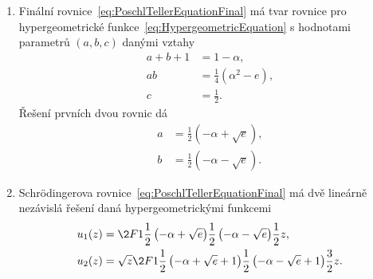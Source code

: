\begin{solution}
\begin{enumerate}
    \item 
        Finální rovnice~\eqref{eq:PoschlTellerEquationFinal} má tvar rovnice pro hypergeometrické funkce~\eqref{eq:HypergeometricEquation} s hodnotami parametrů $(a,b,c)$ danými vztahy
        \begin{subequations}
            \begin{align}
                a+b+1&=1-\alpha,\\
                ab&=\frac{1}{4}\left(\alpha^{2}-e\right),\\
                c&=\frac{1}{2}.
            \end{align}                
        \end{subequations}
        Řešení prvních dvou rovnic dá
        \begin{subequations}
            \begin{align}
                a&=\frac{1}{2}\left(-\alpha+\sqrt{e}\right),\\
                b&=\frac{1}{2}\left(-\alpha-\sqrt{e}\right).
            \end{align}                
        \end{subequations}

    \item
        Schrödingerova rovnice~\eqref{eq:PoschlTellerEquationFinal} má dvě lineárně nezávislá řešení daná hypergeometrickými funkcemi
        \begin{align}
            u_{1}(z)&=\2F1{\frac{1}{2}\left(-\alpha+\sqrt{e}\right)}{\frac{1}{2}\left(-\alpha-\sqrt{e}\right)}{\frac{1}{2}}{z},\\
            u_{2}(z)&=\sqrt{z}\2F1{\frac{1}{2}\left(-\alpha+\sqrt{e}+1\right)}{\frac{1}{2}\left(-\alpha-\sqrt{e}+1\right)}{\frac{3}{2}}{z}.
        \end{align}


\end{enumerate}
\end{solution}
